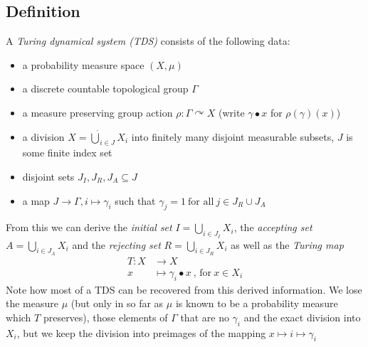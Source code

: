 \subsection{Definition}

\begin{Definition}
	A \emph{Turing dynamical system (TDS)} consists of the following data:
	\begin{itemize}
		\item{a probability measure space $(X,\mu)$}
		\item{a discrete countable topological group $\Gamma$}
		\item{a measure preserving group action $\rho : \Gamma \curvearrowright X$ (write $\gamma \bullet x$ for $\rho(\gamma)(x)$)}
		\item{a division $X = \dot\bigcup_{i \in J} X_i$ into finitely many disjoint measurable subsets, $J$ is some finite index set}
		\item{disjoint sets $J_I, J_R, J_A \subseteq J$}
		\item{a map $J \to \Gamma, i \mapsto \gamma_i$ such that $\gamma_j = 1~\text{for all}~ j \in J_R \cup J_A$}
	\end{itemize}
\end{Definition}

From this we can derive the \emph{initial set} $I = \bigcup_{i\in J_I} X_i$, the \emph{accepting set} $A = \bigcup_{i \in J_A} X_i$ and the \emph{rejecting set} $R = \bigcup_{i \in J_R} X_i$ as well as the \emph{Turing map}
\begin{align*}
	T : X &\to X \\
	x &\mapsto \gamma_i \bullet x~\text{, for}~x \in X_i
\end{align*}
Note how most of a TDS can be recovered from this derived information.
We lose the measure $\mu$ (but only in so far as $\mu$ is known to be a probability measure which $T$ preserves),
those elements of $\Gamma$ that are no $\gamma_i$
and the exact division into $X_i$, but we keep the division into preimages of the mapping $x \mapsto i \mapsto \gamma_i$
